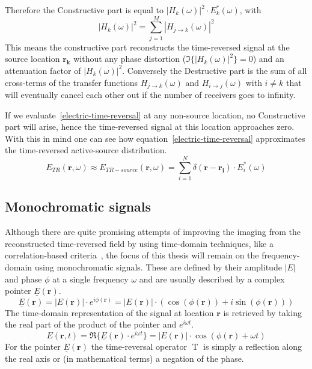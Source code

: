 Therefore the Constructive part is equal to \(|H_k(\omega)|^2 \cdot E^*_k(\omega)\), with
\begin{equation}
    |H_k(\omega)|^2 = \sum_{j=1}^{M} |H_{j\rightarrow k}(\omega)|^2
\end{equation}
This means the constructive part reconstructs the time-reversed signal at the source location \(\mathbf{r_k}\) without any phase distortion (\(\Im \{{|H_k(\omega)|^2}\} = 0\)) and an attenuation factor of \(|H_k(\omega)|^2\).
Conversely the Destructive part is the sum of all cross-terms of the transfer functions \(H_{j\rightarrow k}(\omega)\) and \(H_{i\rightarrow j}(\omega)\) with \(i \neq k\) that will eventually cancel each other out if the number of receivers goes to infinity.

If we evaluate~\eqref{electric-time-reversal} at any non-source location, no Constructive part will arise, hence the time-reversed signal at this location approaches zero.
With this in mind one can see how equation~\eqref{electric-time-reversal} approximates the time-reversed active-source distribution. 
\begin{equation}
    E_{TR}(\mathbf{r}, \omega) \approx E_{TR-source}(\mathbf{r}, \omega) =  \sum_{i=1}^{N} \delta(\mathbf{r}-\mathbf{r_i}) \cdot E^*_i(\omega)
\end{equation}

\subsection{Monochromatic signals}
Although there are quite promising attempts of improving the imaging from the reconstructed time-reversed field by using time-domain techniques, like a correlation-based criteria~\parencite{li_correlation-based_2021}, the focus of this thesis will remain on the frequency-domain using monochromatic signals.
These are defined by their amplitude \(|E|\) and phase \(\phi \) at a single frequency \(\omega \) and are usually described by a complex pointer \(\underline{E}(\mathbf{r})\).
\begin{equation}
    \underline{E}(\mathbf{r}) = |E(\mathbf{r})| \cdot e^{i \phi(\mathbf{r})} = |E(\mathbf{r})| \cdot (\cos(\phi(\mathbf{r})) + i \sin(\phi(\mathbf{r})))
\end{equation}
The time-domain representation of the signal at location \(\mathbf{r}\) is retrieved by taking the real part of the product of the pointer and \(e^{i \omega t}\).
\begin{equation}
    E(\mathbf{r}, t) = \Re \{\underline{E}(\mathbf{r}) \cdot e^{i \omega t}\} = |E(\mathbf{r})| \cdot \cos(\phi(\mathbf{r}) + \omega t)
\end{equation}
For the pointer \(\underline{E}(\mathbf{r})\) the time-reversal operator \(\operatorname{T}\) is simply a reflection along the real axis or (in mathematical terms) a negation of the phase.

